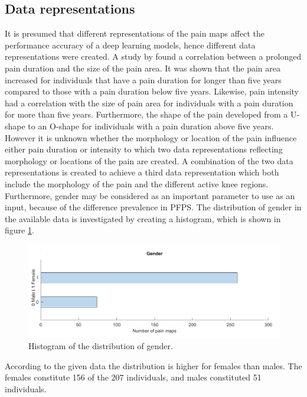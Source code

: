 \subsection{Data representations} \label{sec:representation}
It is presumed that different representations of the pain maps affect the performance accuracy of a deep learning models, hence different data representations were created.
A study by \citeauthor{Boudreau2017} found a correlation between a prolonged pain duration and the size of the pain area. It was shown that the pain area increased for individuals that have a pain duration for longer than five years compared to those with a pain duration below five years. Likewise, pain intensity had a correlation with the size of pain area for individuals with a pain duration for more than five years. Furthermore, the shape of the pain developed from a U-shape to an O-shape for individuals with a pain duration above five years.\citep{Boudreau2017} However it is unknown whether the morphology or location of the pain influence either pain duration or intensity to which two data representations reflecting morphology or locations of the pain are created.
A combination of the two data representations is created to achieve a third data representation which both include the morphology of the pain and the different active knee regions.
\noindent
Furthermore, gender may be considered as an important parameter to use as an input, because of the difference prevalence in PFPS. The distribution of gender in the available data is investigated by creating a histogram, which is shown in figure \ref{fig:histogender}.

\begin{figure} [H]
\centering
\includegraphics[width=1\textwidth]{figures/histoGender}
\caption{Histogram of the distribution of gender.}
\label{fig:histogender}
\end{figure}

\noindent
According to the given data the distribution is higher for females than males. The females constitute 156 of the 207 individuals, and males constituted 51 individuals.  \newline


